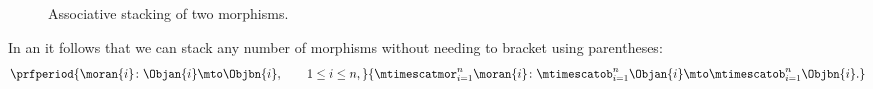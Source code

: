 \begin{marginfigure}[]
    \centering
    \caption{Associative stacking of three morphisms, in one order.}
    \label{fig:associative-stacking-1-new}
\end{marginfigure}

\begin{marginfigure}
    \centering
    \caption{Associative stacking of three morphisms, in another order.}
    \label{fig:associative-stacking-2-new}
\end{marginfigure}

\begin{marginfigure}
    \centering
    \caption{Our string diagram notation for a triple stack.}
    \label{fig:triple-stacked}
\end{marginfigure}

\begin{figure}[h!]
    \centering
    \caption{Associative stacking of two morphisms.}
    \label{fig:double-stacked-new}
\end{figure}

\begin{remark}
    In an   it follows that we can stack any number of morphisms without needing to bracket using parentheses:
    \begin{equation}
        \prfperiod{
            \moran{i} \colon \Objan{i} \mto \Objbn{i}, \qquad 1 \leq i \leq n,
        }{
            \mtimescatmor_{i=1}^n \moran{i} \colon \mtimescatob_{i=1}^n \Objan{i} \mto \mtimescatob_{i=1}^n \Objbn{i}.
        }
    \end{equation}
\end{remark}

